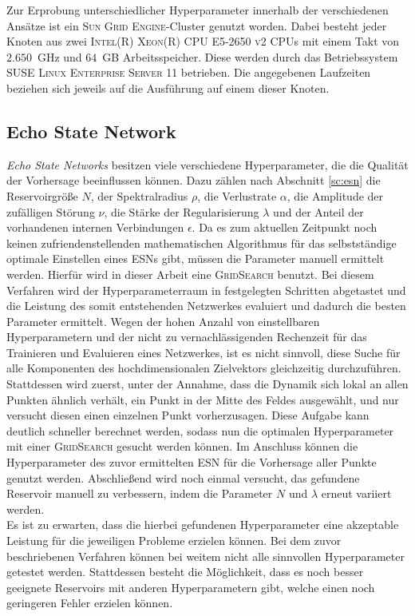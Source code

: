 Zur Erprobung unterschiedlicher Hyperparameter innerhalb der verschiedenen Ansätze ist ein \textsc{Sun Grid Engine}-Cluster genutzt worden. Dabei besteht jeder Knoten aus zwei \textsc{Intel(R) Xeon(R) CPU E5-2650 v2} CPUs mit einem Takt von $2.650$~GHz und $64$~GB Arbeitsspeicher. Diese werden durch das Betriebssystem \textsc{SUSE Linux Enterprise Server 11} betrieben. Die angegebenen Laufzeiten beziehen sich jeweils auf die Ausführung auf einem dieser Knoten. 


\FloatBarrier
\subsection{Echo State Network}
\label{sec:exp_general_esn}
\textit{Echo State Networks} besitzen viele verschiedene Hyperparameter, die die Qualität der Vorhersage beeinflussen können. Dazu zählen nach Abschnitt \ref{sc:esn} die Reservoirgröße $N$, der Spektralradius $\rho$, die Verlustrate $\alpha$, die Amplitude der zufälligen Störung $\nu$, die Stärke der Regularisierung $\lambda$ und der Anteil der vorhandenen internen Verbindungen $\epsilon$. Da es zum aktuellen Zeitpunkt noch keinen zufriendenstellenden mathematischen Algorithmus für das selbstständige optimale Einstellen eines \textsc{ESN}s gibt, müssen die Parameter manuell ermittelt werden. Hierfür wird in dieser Arbeit eine \textsc{GridSearch} benutzt. Bei diesem Verfahren wird der Hyperparameterraum in festgelegten Schritten abgetastet und die Leistung des somit entstehenden Netzwerkes evaluiert und dadurch die besten Parameter ermittelt. Wegen der hohen Anzahl von einstellbaren Hyperparametern und der nicht zu vernachlässigenden Rechenzeit für das Trainieren und Evaluieren eines Netzwerkes, ist es nicht sinnvoll, diese Suche für alle Komponenten des hochdimensionalen Zielvektors gleichzeitig durchzuführen. Stattdessen wird zuerst, unter der Annahme, dass die Dynamik sich lokal an allen Punkten ähnlich verhält, ein Punkt in der Mitte des Feldes ausgewählt, und nur versucht diesen einen einzelnen Punkt vorherzusagen. Diese Aufgabe kann deutlich schneller berechnet werden, sodass nun die optimalen Hyperparameter mit einer \textsc{GridSearch} gesucht werden können. Im Anschluss können die Hyperparameter des  zuvor ermittelten \textsc{ESN} für die Vorhersage aller Punkte genutzt werden. Abschließend wird noch einmal versucht, das gefundene Reservoir manuell zu verbessern, indem die Parameter $N$ und $\lambda$ erneut variiert werden.\\
Es ist zu erwarten, dass die hierbei gefundenen Hyperparameter eine akzeptable Leistung für die jeweiligen Probleme erzielen können. Bei dem zuvor beschriebenen Verfahren können bei weitem nicht alle sinnvollen Hyperparameter getestet werden. Stattdessen besteht die Möglichkeit, dass es noch besser geeignete Reservoirs mit anderen Hyperparametern gibt, welche einen noch geringeren Fehler erzielen können.\\

